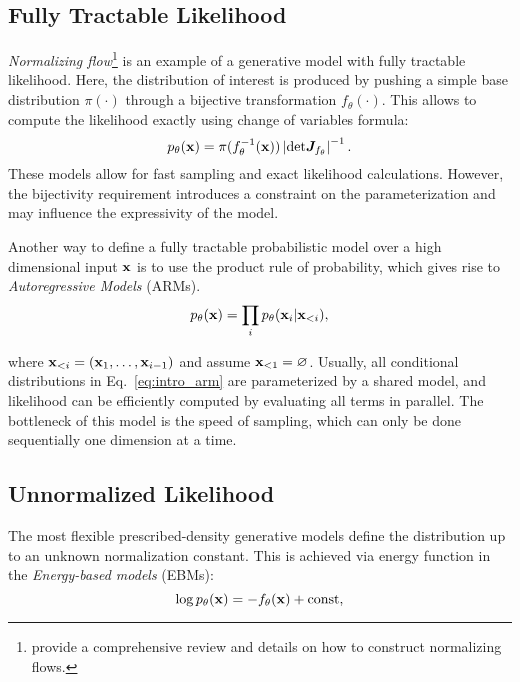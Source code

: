 \subsection{Fully Tractable Likelihood}
\textit{Normalizing flow}\footnote[][]{\citet{papamakarios2021normalizing} provide a comprehensive review and details on how to construct normalizing flows.} is an example of a generative model with fully tractable likelihood. Here, the distribution of interest is produced by pushing a simple base distribution $\pi(\cdot)$ through a bijective transformation $f_{\theta}(\cdot)$. This allows to compute the likelihood exactly using change of variables formula:
\begin{equation}\label{eq:intro_nf}
    p_{\theta}(\rvx) = \pi(f^{-1}_{\theta}(\rvx)) \left|\text{det}\mJ_{f_{\theta}}  \right|^{-1}.
\end{equation}
These models allow for fast sampling and exact likelihood calculations. However, the bijectivity requirement introduces a constraint on the parameterization and may influence the expressivity of the model. 

Another way to define a fully tractable probabilistic model over a high dimensional input ${\mathbf{x}}$ is to use the product rule of probability, which gives rise to \textit{Autoregressive Models} (ARMs).  
\begin{equation}\label{eq:intro_arm}
    p_{\theta}(\rvx) = \prod_{i}p_{\theta}(\rvx_i | \rvx_{<i}),
\end{equation}

where ${\mathbf{x}}_{<i} = ({\mathbf{x}}_1, \dots, {\mathbf{x}}_{i-1})$ and assume ${\mathbf{x}}_{<1} = \varnothing$. Usually, all conditional distributions in Eq.~\ref{eq:intro_arm} are parameterized by a shared model, and likelihood can be efficiently computed by evaluating all terms in parallel. The bottleneck of this model is the speed of sampling, which can only be done sequentially one dimension at a time.

\subsection{Unnormalized Likelihood}
The most flexible prescribed-density generative models define the distribution up to an unknown normalization constant.
This is achieved via energy function in the \textit{Energy-based models} (EBMs): 
\begin{equation}
    \log p_{\theta}({\mathbf{x}}) = -f_{\theta}({\mathbf{x}}) + \text{const},
\end{equation}

